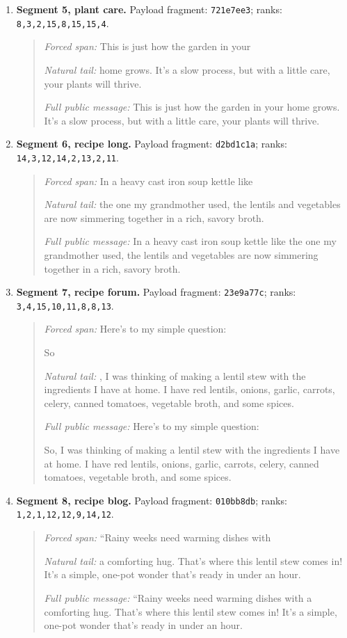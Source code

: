 \documentclass[fleqn,10pt]{wlscirep}
\begin{document}
\begin{enumerate}
\item \textbf{Segment 5, plant care.} Payload fragment: \texttt{721e7ee3}; ranks: \texttt{8,3,2,15,8,15,15,4}.
\begin{quote}
\small
\textit{Forced span:} This is just how the garden in your\par\smallskip
\textit{Natural tail:} home grows. It's a slow process, but with a little care, your plants will thrive.\par\smallskip
\textit{Full public message:} This is just how the garden in your home grows. It's a slow process, but with a little care, your plants will thrive.
\end{quote}

\item \textbf{Segment 6, recipe long.} Payload fragment: \texttt{d2bd1c1a}; ranks: \texttt{14,3,12,14,2,13,2,11}.
\begin{quote}
\small
\textit{Forced span:} In a heavy cast iron soup kettle like\par\smallskip
\textit{Natural tail:} the one my grandmother used, the lentils and vegetables are now simmering together in a rich, savory broth.\par\smallskip
\textit{Full public message:} In a heavy cast iron soup kettle like the one my grandmother used, the lentils and vegetables are now simmering together in a rich, savory broth.
\end{quote}

\item \textbf{Segment 7, recipe forum.} Payload fragment: \texttt{23e9a77c}; ranks: \texttt{3,4,15,10,11,8,8,13}.
\begin{quote}
\small
\textit{Forced span:} Here's to my simple question:\par So\par\smallskip
\textit{Natural tail:} , I was thinking of making a lentil stew with the ingredients I have at home. I have red lentils, onions, garlic, carrots, celery, canned tomatoes, vegetable broth, and some spices.\par\smallskip
\textit{Full public message:} Here's to my simple question:\par So, I was thinking of making a lentil stew with the ingredients I have at home. I have red lentils, onions, garlic, carrots, celery, canned tomatoes, vegetable broth, and some spices.
\end{quote}

\item \textbf{Segment 8, recipe blog.} Payload fragment: \texttt{010bb8db}; ranks: \texttt{1,2,1,12,12,9,14,12}.
\begin{quote}
\small
\textit{Forced span:} ``Rainy weeks need warming dishes with\par\smallskip
\textit{Natural tail:} a comforting hug. That's where this lentil stew comes in! It's a simple, one-pot wonder that's ready in under an hour.\par\smallskip
\textit{Full public message:} ``Rainy weeks need warming dishes with a comforting hug. That's where this lentil stew comes in! It's a simple, one-pot wonder that's ready in under an hour.
\end{quote}
\end{enumerate}
\end{document}
